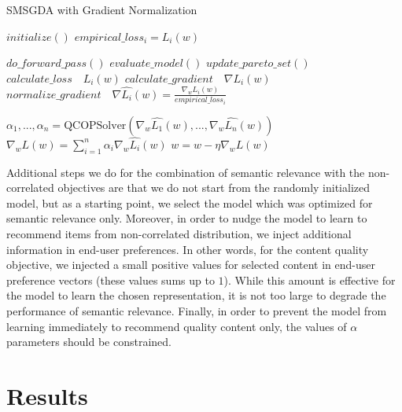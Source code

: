 \documentclass[letterpaper]{article}
\begin{document}
\begin{algorithm}
    \scriptsize
    \caption{SMSGDA with Gradient Normalization}
    \label{alg:pseudocode}
    \begin{algorithmic}[1] 
            \State $initialize()$
                \State $empirical\_loss_i = L_i(w)$
            \EndFor

                    \State $do\_forward\_pass()$
                    \State $evaluate\_model()$
                    \State $update\_pareto\_set()$
                        \State $calculate\_loss \quad L_i(w)$
                        \State $calculate\_gradient \quad \nabla L_i(w)$
                        \State $normalize\_gradient \quad \nabla\hat{L_i}(w) = \frac{\nabla_wL_i(w)}{empirical\_loss_i}$
                    \EndFor
                    
                    \State $\alpha_1,...,\alpha_n = \textrm{QCOPSolver}\left(\nabla_w\hat{L_1}(w),...,\nabla_w\hat{L_n}(w)\right)$
                    \State $\nabla_wL(w)=\sum_{i=1}^n\alpha_i\nabla_w\hat{L_i}(w)$
                    \State $w = w-\eta\nabla_wL(w)$
                \EndFor
            \EndFor
    \end{algorithmic}
\end{algorithm}

Additional steps we do for the combination of semantic relevance with the non-correlated objectives are that we do not start from the randomly initialized model, but as a starting point, we select the model which was optimized for semantic relevance only. Moreover, in order to nudge the model to learn to recommend items from non-correlated distribution, we inject additional information in end-user preferences. In other words, for the content quality objective, we injected a small positive values for selected content in end-user preference vectors (these values sums up to $1$). While this amount is effective for the model to learn the chosen representation, it is not too large to degrade the performance of semantic relevance. Finally, in order to prevent the model from learning immediately to recommend quality content only, the values of $\alpha$ parameters should be constrained.



\section{Results}
\end{document}
